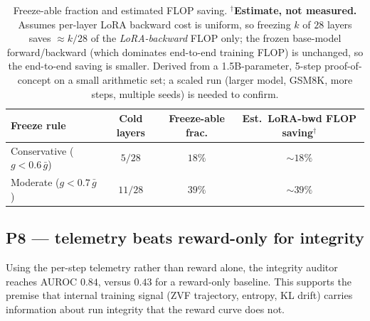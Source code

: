 \documentclass[12pt,a4paper]{report}
\begin{document}
\begin{table}[h]
\centering
\small
\begin{tabular}{lccc}
\toprule
Freeze rule & Cold layers & Freeze-able frac. & Est.\ LoRA-bwd FLOP saving$^{\dagger}$ \\
\midrule
Conservative ($g<0.6\,\bar{g}$) & $5/28$  & $18\%$ & $\sim\!18\%$ \\
Moderate ($g<0.7\,\bar{g}$)     & $11/28$ & $39\%$ & $\sim\!39\%$ \\
\bottomrule
\end{tabular}
\caption{Freeze-able fraction and estimated FLOP saving. $^{\dagger}$\textbf{Estimate,
not measured.} Assumes per-layer LoRA backward cost is uniform, so freezing $k$ of
$28$ layers saves $\approx k/28$ of the \emph{LoRA-backward} FLOP only; the frozen
base-model forward/backward (which dominates end-to-end training FLOP) is unchanged,
so the end-to-end saving is smaller. Derived from a 1.5B-parameter, 5-step
proof-of-concept on a small arithmetic set; a scaled run (larger model, GSM8K, more
steps, multiple seeds) is needed to confirm.}
\label{tab:p1-freeze-estimate}
\end{table}

\subsection{P8 --- telemetry beats reward-only for integrity}
Using the per-step telemetry rather than reward alone, the integrity auditor
reaches AUROC $0.84$, versus $0.43$ for a reward-only baseline. This supports the
premise that internal training signal (ZVF trajectory, entropy, KL drift) carries
information about run integrity that the reward curve does not.
\end{document}
